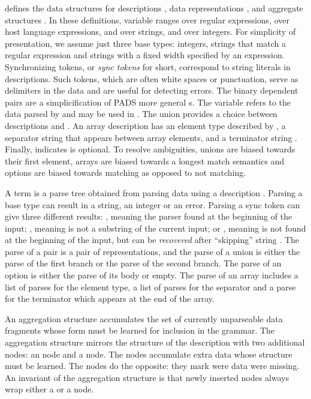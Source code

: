 defines
the data structures for descriptions , data
representations , and aggregate structures .
In these definitions,  variable  ranges over regular expressions,
 over host language expressions,
 and  over strings, and  over integers.
For simplicity of presentation, we assume just three base types: 
integers, strings that match a regular expression and strings with a
fixed width specified by an expression. Synchronizing
tokens, or {\em sync tokens} for short, correspond to string literals
in \pads{} descriptions.  Such tokens, which are often
white spaces or punctuation,
serve as delimiters in the data and are useful for detecting
errors. The binary dependent pairs  are
a simplicification of PADS more general s. 
The variable  refers to the data parsed by 
and may be used in . The union 
provides a choice between descriptions  and .
An array description
 has an element type described by , a separator
string  that appears between array elements, and a
terminator string . Finally,  indicates  is 
optional.  To resolve ambiguities, unions are
biased towards their first element, arrays are biased towards a longest match
semantics and options are biased towards matching as opposed to not matching.

A term  is a parse tree obtained from parsing 
data using a description .  Parsing a base type can result in a
string, an integer or an error.  Parsing a sync token
 can give three different results: , meaning the
parser found  at the beginning of the input; , meaning
 is not a substring of the current input; or ,
meaning  is not found at the beginning of the input, but
can be {\em recovered} after ``skipping'' string .  The parse
of a pair is a pair of representations, and the parse of a union is
either the parse of the first branch or the parse of the second
branch. The parse of an option is either the parse of its body or  empty.
The parse of an array includes a list of parses for the
element type, a list of parses for the separator and a parse for the
terminator which appears at the end of the array.

An aggregation structure accumulates the set of currently
unparseable data fragments whose form must be learned
for inclusion in the grammar.
The aggregation structure mirrors the structure of the description  
with two additional nodes: an  node and a  node. 
The  nodes accumulate extra data whose structure must be learned.
The  nodes do the opposite: they mark were data were missing.  
An invariant
of the aggregation structure is that
newly inserted  nodes always wrap either a  or 
a  node.

